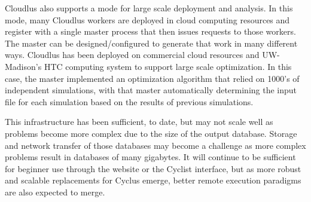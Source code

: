 Cloudlus also supports a mode for large scale deployment and analysis.  In
this mode, many Cloudlus workers are deployed in cloud computing resources and
register with a single master process that then issues requests to those
workers. The master can be designed/configured to generate that work in many
different ways. Cloudlus has been deployed on commercial cloud resources and
UW-Madison's \gls{HTC} computing system to support large scale optimization.
In this case, the master implemented an optimization algorithm that relied on
1000's of independent \Cyclus simulations, with that master automatically
determining the input file for each simulation based on the results of
previous simulations.

This infrastructure has been sufficient, to date, but may not scale well as
problems become more complex due to the size of the output database.  Storage
and network transfer of those databases may become a challenge as more complex
problems result in databases of many gigabytes.  It will continue to be
sufficient for beginner use through the website or the Cyclist interface, but
as more robust and scalable replacements for Cyclus emerge, better remote
execution paradigms are also expected to merge.
